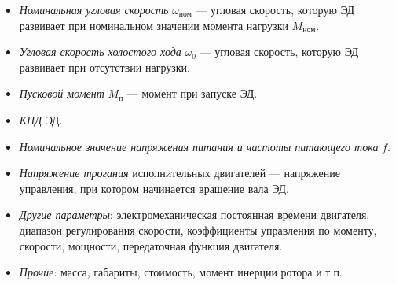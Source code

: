 \begin{itemize}
	\item \textit{Номинальная угловая скорость} $ \omega_\text{ном} $ --- угловая скорость, которую ЭД развивает при номинальном значении момента нагрузки $ M_\text{ном} $.
	\item \textit{Угловая скорость холостого хода} $ \omega_0 $ --- угловая скорость, которую ЭД развивает при отсутствии нагрузки.
	\item \textit{Пусковой момент} $ M_\text{п} $ --- момент при запуске ЭД.
	\item \textit{КПД} ЭД.
	\item \textit{Номинальное значение напряжения питания и частоты питающего тока} $ f $.
	\item \textit{Напряжение трогания} исполнительных двигателей --- напряжение управления, при котором начинается вращение вала ЭД.
	\item \textit{Другие параметры}: электромеханическая постоянная времени двигателя, диапазон регулирования скорости, коэффициенты управления по моменту, скорости, мощности, передаточная функция двигателя.
	\item \textit{Прочие}: масса, габариты, стоимость, момент инерции ротора и т.п.
\end{itemize}



